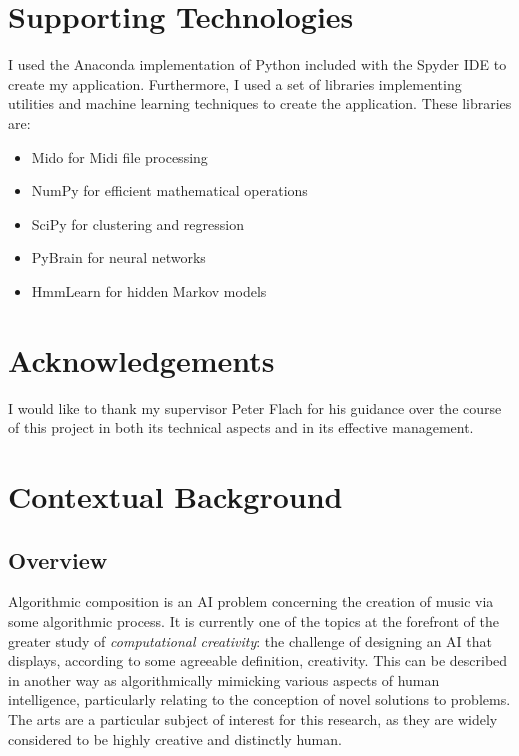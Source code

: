 \documentclass[ author={Stephen Livermore-Tozer},
				supervisor={Dr. Peter Flach},
				degree={MEng},
				title={Performing Algorithmic Co-composition Using Machine Learning},
				subtitle={},
				type={research},
				year={2016} ]{dissertation}
\begin{document}
	\chapter*{Supporting Technologies}
	
	I used the Anaconda implementation of Python included with the Spyder IDE to create my application. Furthermore, I used a set of libraries implementing utilities and machine learning techniques to create the application. These libraries are: 
	
	\begin{itemize}
		\item Mido for Midi file processing
		\item NumPy for efficient mathematical operations
		\item SciPy for clustering and regression
		\item PyBrain for neural networks
		\item HmmLearn for hidden Markov models
	\end{itemize}
	
	
	\chapter*{Acknowledgements}
	
	I would like to thank my supervisor Peter Flach for his guidance over the course of this project in both its technical aspects and in its effective management.
	
	\mainmatter
	
	
	\chapter{Contextual Background}
	\label{chap:context}
	
	\section{Overview}
	
	Algorithmic composition is an AI problem concerning the creation of music via some algorithmic process. It is currently one of the topics at the forefront of the greater study of \textit{computational creativity}: the challenge of designing an AI that displays, according to some agreeable definition, creativity. This can be described in another way as algorithmically mimicking various aspects of human intelligence, particularly relating to the conception of novel solutions to problems. The arts are a particular subject of interest for this research, as they are widely considered to be highly creative and distinctly human.
	
\end{document}
